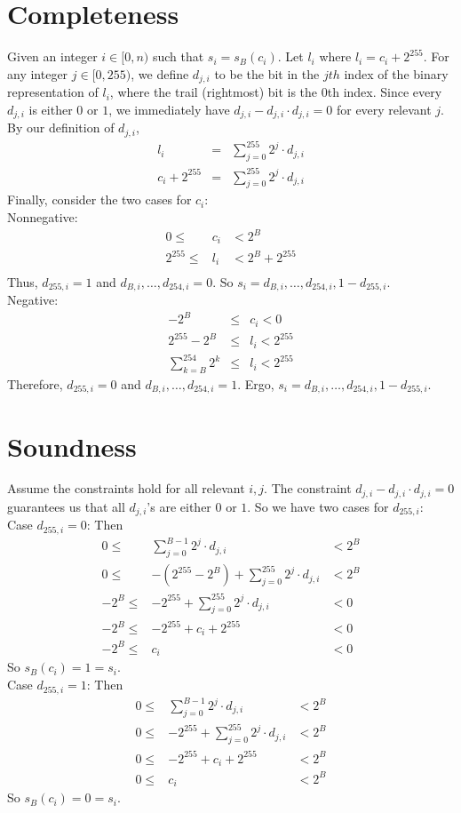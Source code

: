 \documentclass[11pt]{article}
\begin{document}
\section{Completeness}
Given an integer $i\in[0, n)$ such that $s_i = s_B(c_i)$. Let $l_i$ where $l_i=c_i+2^{255}$. 
For any integer $j\in [0, 255)$, we define $d_{j,i}$ to be the bit in the $jth$ index of the binary representation of $l_i$, 
where the trail (rightmost) bit is the $0$th index. Since every $d_{j,i}$ is either $0$ or $1$, 
we immediately have $d_{j,i} - d_{j,i}\cdot d_{j,i}=0$ for every relevant $j$. By our definition of $d_{j,i}$,
\begin{eqnarray*}
l_i&=&\sum_{j=0}^{255} 2^j\cdot d_{j,i}\\
c_i + 2^{255}&=&\sum_{j=0}^{255} 2^j\cdot d_{j,i}
\end{eqnarray*}
Finally, consider the two cases for $c_i$:\\
Nonnegative: 
\begin{eqnarray*}
0\leq& c_i&<2^B\\
2^{255}\leq& l_i&<2^B+2^{255}\\
\end{eqnarray*}
Thus, $d_{255,i} = 1$ and $d_{B,i},\ldots,d_{254,i}=0$. So $s_i=d_{B,i},\ldots, d_{254,i},1-d_{255,i}$.\\
Negative:
\begin{eqnarray*}
-2^B&\leq& c_i<0\\
2^{255}-2^B&\leq& l_i<2^{255}\\
\sum_{k=B}^{254} 2^k&\leq& l_i<2^{255}
\end{eqnarray*}
Therefore, $d_{255,i}=0$ and $d_{B,i},\ldots,d_{254,i}=1$. Ergo, $s_i=d_{B,i},\ldots, d_{254,i},1-d_{255,i}$.

\section{Soundness}
Assume the constraints hold for all relevant $i,j$. 
The constraint $d_{j,i} - d_{j,i}\cdot d_{j,i}=0$ guarantees us that all $d_{j,i}$'s are either $0$ or $1$. 
So we have two cases for $d_{255,i}$:\\
Case $d_{255,i}=0$: Then
\begin{eqnarray*}
0\leq&\sum_{j=0}^{B-1} 2^j\cdot d_{j,i}&<2^B\\
0\leq&-(2^{255}-2^B)+\sum_{j=0}^{255} 2^j\cdot d_{j,i}&<2^B\\
-2^B\leq&-2^{255}+\sum_{j=0}^{255} 2^j\cdot d_{j,i}&<0\\
-2^B\leq&-2^{255}+c_i + 2^{255}&<0\\
-2^B\leq&c_i&<0
\end{eqnarray*}
So $s_B(c_i)=1=s_i$.\\
Case $d_{255,i}=1$: Then
\begin{eqnarray*}
0\leq&\sum_{j=0}^{B-1} 2^j\cdot d_{j,i}&<2^B\\
0\leq&-2^{255}+\sum_{j=0}^{255} 2^j\cdot d_{j,i}&<2^B\\
0\leq&-2^{255}+c_i + 2^{255}&<2^B\\
0\leq&c_i&<2^B
\end{eqnarray*}
So $s_B(c_i)=0=s_i$.
\end{document}
